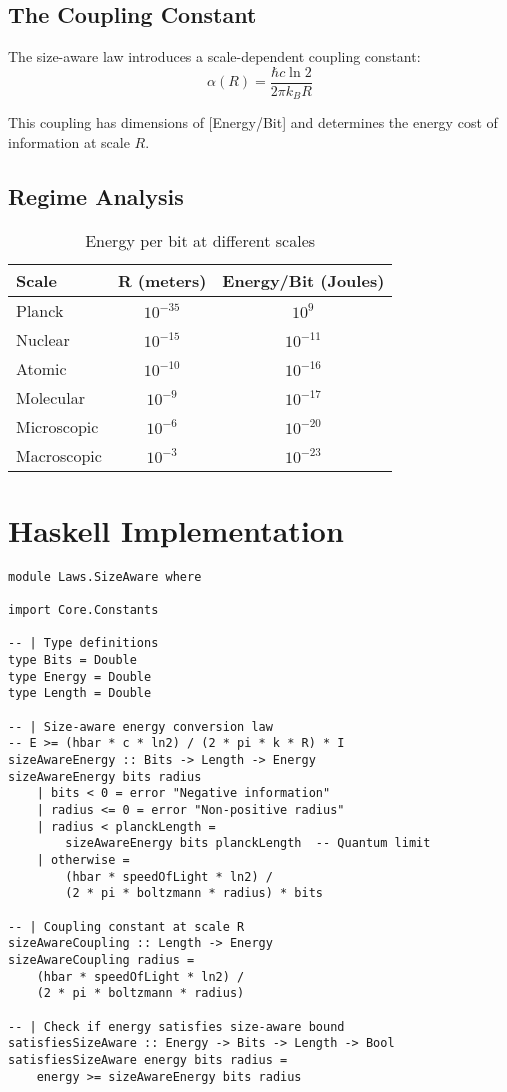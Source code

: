 \documentclass[11pt,a4paper]{article}
\theoremstyle{definition}
\begin{document}
\subsection{The Coupling Constant}

The size-aware law introduces a scale-dependent coupling constant:
\begin{equation}
\alpha(R) = \frac{\hbar c \ln 2}{2\pi k_B R}
\end{equation}

This coupling has dimensions of [Energy/Bit] and determines the energy cost of information at scale $R$.

\subsection{Regime Analysis}

\begin{table}[h]
\centering
\begin{tabular}{|l|c|c|}
\hline
\textbf{Scale} & \textbf{R (meters)} & \textbf{Energy/Bit (Joules)} \\
\hline
Planck & $10^{-35}$ & $10^{9}$ \\
Nuclear & $10^{-15}$ & $10^{-11}$ \\
Atomic & $10^{-10}$ & $10^{-16}$ \\
Molecular & $10^{-9}$ & $10^{-17}$ \\
Microscopic & $10^{-6}$ & $10^{-20}$ \\
Macroscopic & $10^{-3}$ & $10^{-23}$ \\
\hline
\end{tabular}
\caption{Energy per bit at different scales}
\end{table}

\section{Haskell Implementation}

\begin{lstlisting}
module Laws.SizeAware where

import Core.Constants

-- | Type definitions
type Bits = Double
type Energy = Double  
type Length = Double

-- | Size-aware energy conversion law
-- E >= (hbar * c * ln2) / (2 * pi * k * R) * I
sizeAwareEnergy :: Bits -> Length -> Energy
sizeAwareEnergy bits radius 
    | bits < 0 = error "Negative information"
    | radius <= 0 = error "Non-positive radius"
    | radius < planckLength = 
        sizeAwareEnergy bits planckLength  -- Quantum limit
    | otherwise = 
        (hbar * speedOfLight * ln2) / 
        (2 * pi * boltzmann * radius) * bits

-- | Coupling constant at scale R
sizeAwareCoupling :: Length -> Energy
sizeAwareCoupling radius = 
    (hbar * speedOfLight * ln2) / 
    (2 * pi * boltzmann * radius)

-- | Check if energy satisfies size-aware bound
satisfiesSizeAware :: Energy -> Bits -> Length -> Bool
satisfiesSizeAware energy bits radius =
    energy >= sizeAwareEnergy bits radius
\end{lstlisting}
\end{document}
